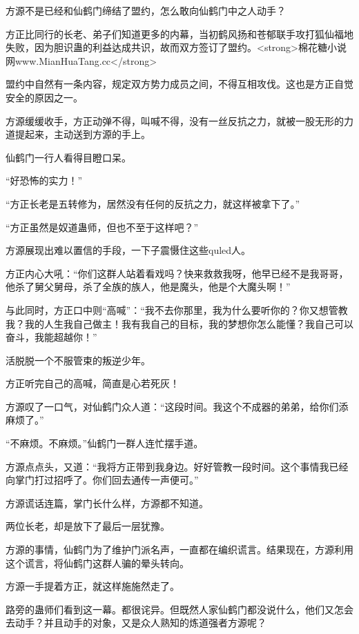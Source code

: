 
\begin{this_body}

方源不是已经和仙鹤门缔结了盟约，怎么敢向仙鹤门中之人动手？

方正比同行的长老、弟子们知道更多的内幕，当初鹤风扬和苍郁联手攻打狐仙福地失败，因为胆识蛊的利益达成共识，故而双方签订了盟约。<strong>棉花糖小说网www.MianHuaTang.cc</strong>

盟约中自然有一条内容，规定双方势力成员之间，不得互相攻伐。这也是方正自觉安全的原因之一。

方源缓缓收手，方正动弹不得，叫喊不得，没有一丝反抗之力，就被一股无形的力道提起来，主动送到方源的手上。

仙鹤门一行人看得目瞪口呆。

“好恐怖的实力！”

“方正长老是五转修为，居然没有任何的反抗之力，就这样被拿下了。”

“方正虽然是奴道蛊师，但也不至于这样吧？”

方源展现出难以置信的手段，一下子震慑住这些quled人。

方正内心大吼：“你们这群人站着看戏吗？快来救救我呀，他早已经不是我哥哥，他杀了舅父舅母，杀了全族的族人，他是魔头，他是个大魔头啊！”

与此同时，方正口中则“高喊”：“我不去你那里，我为什么要听你的？你又想管教我？我的人生我自己做主！我有我自己的目标，我的梦想你怎么能懂？我自己可以奋斗，我能超越你！”

活脱脱一个不服管束的叛逆少年。

方正听完自己的高喊，简直是心若死灰！

方源叹了一口气，对仙鹤门众人道：“这段时间。我这个不成器的弟弟，给你们添麻烦了。”

“不麻烦。不麻烦。”仙鹤门一群人连忙摆手道。

方源点点头，又道：“我将方正带到我身边。好好管教一段时间。这个事情我已经向掌门打过招呼了。你们回去通传一声便可。”

方源谎话连篇，掌门长什么样，方源都不知道。

两位长老，却是放下了最后一层犹豫。

方源的事情，仙鹤门为了维护门派名声，一直都在编织谎言。结果现在，方源利用这个谎言，将仙鹤门这群人骗的晕头转向。

方源一手提着方正，就这样施施然走了。

路旁的蛊师们看到这一幕。都很诧异。但既然人家仙鹤门都没说什么，他们又怎会去动手？并且动手的对象，又是众人熟知的炼道强者方源呢？


\end{this_body}
